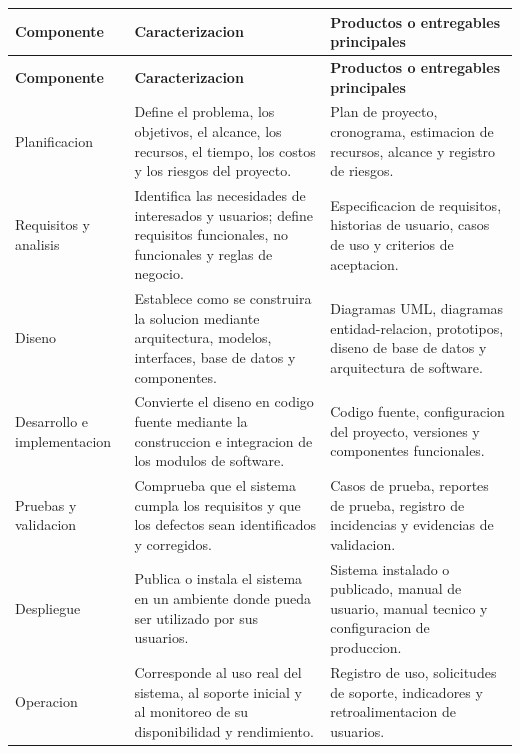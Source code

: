 \documentclass[12pt,letterpaper]{article}
\begin{document}
\begin{longtable}{|p{3.5cm}|p{5.5cm}|p{5.6cm}|}
\hline
\textbf{Componente} & \textbf{Caracterizacion} & \textbf{Productos o entregables principales} \\
\hline
\endfirsthead
\hline
\textbf{Componente} & \textbf{Caracterizacion} & \textbf{Productos o entregables principales} \\
\hline
\endhead
\hline
\endfoot
\hline
\endlastfoot

Planificacion & Define el problema, los objetivos, el alcance, los recursos, el tiempo, los costos y los riesgos del proyecto. & Plan de proyecto, cronograma, estimacion de recursos, alcance y registro de riesgos. \\
\hline

Requisitos y analisis & Identifica las necesidades de interesados y usuarios; define requisitos funcionales, no funcionales y reglas de negocio. & Especificacion de requisitos, historias de usuario, casos de uso y criterios de aceptacion. \\
\hline

Diseno & Establece como se construira la solucion mediante arquitectura, modelos, interfaces, base de datos y componentes. & Diagramas UML, diagramas entidad-relacion, prototipos, diseno de base de datos y arquitectura de software. \\
\hline

Desarrollo e implementacion & Convierte el diseno en codigo fuente mediante la construccion e integracion de los modulos de software. & Codigo fuente, configuracion del proyecto, versiones y componentes funcionales. \\
\hline

Pruebas y validacion & Comprueba que el sistema cumpla los requisitos y que los defectos sean identificados y corregidos. & Casos de prueba, reportes de prueba, registro de incidencias y evidencias de validacion. \\
\hline

Despliegue & Publica o instala el sistema en un ambiente donde pueda ser utilizado por sus usuarios. & Sistema instalado o publicado, manual de usuario, manual tecnico y configuracion de produccion. \\
\hline

Operacion & Corresponde al uso real del sistema, al soporte inicial y al monitoreo de su disponibilidad y rendimiento. & Registro de uso, solicitudes de soporte, indicadores y retroalimentacion de usuarios. \\
\hline


\end{longtable}
\end{document}
